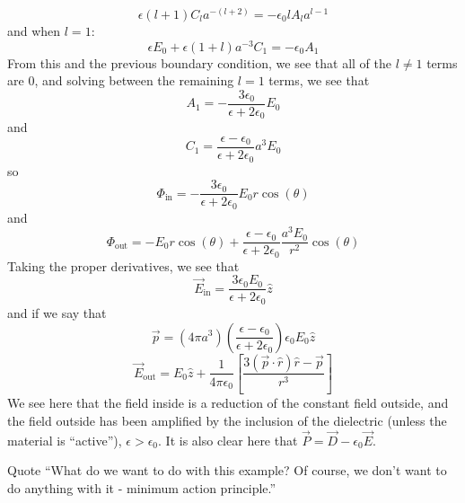 \documentclass[a4paper,twoside,master.tex]{subfiles}
\begin{document}
\begin{ex}
\begin{equation}
        \epsilon (l+1) C_l a^{-(l+2)} = - \epsilon_0 l A_l a^{l-1}
    \end{equation}
    and when $l = 1$:
    \begin{equation}
        \epsilon E_0 + \epsilon (1+l) a^{-3}C_1 = - \epsilon_0 A_1
    \end{equation}
    From this and the previous boundary condition, we see that all of the $l \neq 1 $ terms are $0$, and solving between the remaining $l = 1 $ terms, we see that
    \begin{equation}
        A_1 = - \frac{3 \epsilon_0}{\epsilon + 2 \epsilon_0} E_0
    \end{equation}
    and
    \begin{equation}
        C_1 = \frac{\epsilon - \epsilon_0}{\epsilon + 2 \epsilon_0} a^3 E_0
    \end{equation}
    so
    \begin{equation}
        \Phi_{\text{in}} = - \frac{3 \epsilon_0}{\epsilon + 2 \epsilon_0} E_0 r \cos(\theta)
    \end{equation}
    and
    \begin{equation}
        \Phi_{\text{out}} = -E_0 r \cos(\theta) + \frac{\epsilon - \epsilon_0}{\epsilon + 2 \epsilon_0} \frac{a^3 E_0}{r^2} \cos(\theta)
    \end{equation}
    Taking the proper derivatives, we see that
    \begin{equation}
        \vec{E}_{\text{in}} = \frac{3 \epsilon_0 E_0}{\epsilon + 2 \epsilon_0} \hat{z}
    \end{equation}
    and if we say that
    \begin{equation}
        \vec{p} = (4 \pi a^3 ) \left( \frac{\epsilon - \epsilon_0}{\epsilon + 2 \epsilon_0}\right) \epsilon_0 E_0 \hat{z}
    \end{equation}
    \begin{equation}
        \vec{E}_{\text{out}} = E_0 \hat{z} + \frac{1}{4 \pi \epsilon_0} \left[ \frac{3( \vec{p} \cdot \hat{r} ) \hat{r} - \vec{p}}{r^3} \right]
    \end{equation}
    We see here that the field inside is a reduction of the constant field outside, and the field outside has been amplified by the inclusion of the dielectric (unless the material is ``active''), $ \epsilon > \epsilon_0 $. It is also clear here that $ \vec{P} = \vec{D} - \epsilon_0 \vec{E} $.
\end{ex}

\begin{note}{Quote}
    ``What do we want to do with this example? Of course, we don't want to do anything with it - minimum action principle.''
\end{note}
\end{document}
